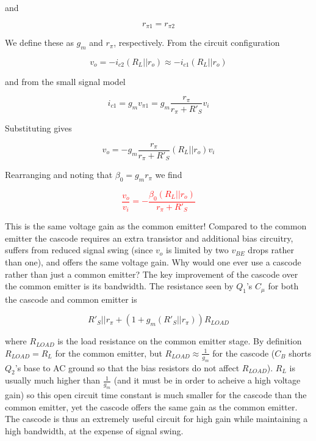 \noindent and

\begin{equation}
r_{\pi 1} = r_{\pi 2}
\end{equation}

\noindent We define these as $g_{m}$ and $r_{\pi}$, respectively. From the circuit configuration

\begin{equation}
v_{o} = -i_{c2}(R_{L}||r_{o}) \approx -i_{c1}(R_{L}||r_{o})
\end{equation}

\noindent and from the small signal model

\begin{equation}
i_{c1} = g_{m}v_{\pi 1} = g_{m}\frac{r_{\pi}}{r_{\pi}+ R'_{S}}v_{i}
\end{equation}

\noindent Substituting gives

\begin{equation}
v_{o} = -g_{m}\frac{r_{\pi}}{r_{\pi}+ R'_{S}}(R_{L}||r_{o})v_{i}
\end{equation}

\noindent Rearranging and noting that $\beta_{0} = g_{m}r_{\pi}$ we find

\textcolor{red}{
\begin{equation}
\frac{v_{o}}{v_{i}} = -\frac{\beta_{0} (R_{L}||r_{o})}{r_{\pi}+ R'_{S}}
\end{equation}
}

\par
This is the same voltage gain as the common emitter! Compared to the common emitter the cascode requires an extra transistor and additional bias circuitry, suffers from reduced signal swing (since $v_{o}$ is limited by two $v_{BE}$ drops rather than one), and offers the same voltage gain. Why would one ever use a cascode rather than just a common emitter? The key improvement of the cascode over the common emitter is its bandwidth. The resistance seen by $Q_{1}$'s $C_{\mu}$ for both the cascode and common emitter is

\begin{equation}
R'_{S}||r_{\pi} + (1 + g_{m}(R'_{S}||r_{\pi}))R_{LOAD}
\end{equation}

where $R_{LOAD}$ is the load resistance on the common emitter stage. By definition $R_{LOAD} = R_{L}$ for the common emitter, but $R_{LOAD} \approx \frac{1}{g_{m}}$ for the cascode ($C_{B}$ shorts $Q_{2}$'s base to AC ground so that the bias resistors do not affect $R_{LOAD}$). $R_{L}$ is usually much higher than $\frac{1}{g_{m}}$ (and it must be in order to acheive a high voltage gain) so this open circuit time constant is much smaller for the cascode than the common emitter, yet the cascode offers the same gain as the common emitter. The cascode is thus an extremely useful circuit for high gain while maintaining a high bandwidth, at the expense of signal swing.

